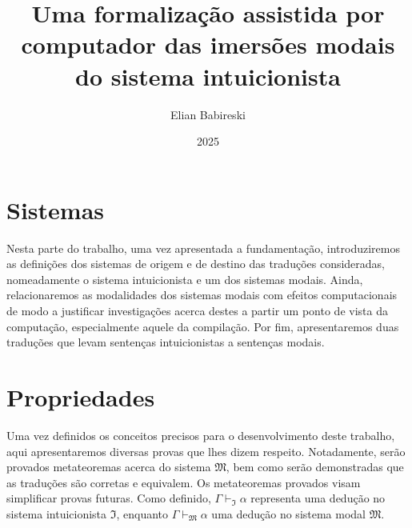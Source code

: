 


    \title{Uma formalização assistida por computador das imersões modais do sistema intuicionista}
    \author{Elian Babireski}
    \date{2025}

    
    
    
    
    
    
    
    

    \tableofcontents

    \setcounter{page}{9}

    
    

    \chapter{Sistemas}\label{systems}

        Nesta parte do trabalho, uma vez apresentada a fundamentação, introduziremos as definições dos sistemas de origem e de destino das traduções consideradas, nomeadamente o sistema intuicionista e um dos sistemas modais.
        Ainda, relacionaremos as modalidades dos sistemas modais com efeitos computacionais de modo a justificar investigações acerca destes a partir um ponto de vista da computação, especialmente aquele da compilação.
        Por fim, apresentaremos duas traduções que levam sentenças intuicionistas a sentenças modais.

        \label{systems.intuitionistic}
        \label{systems.modal}
        \label{systems.effects}
        \label{systems.translations}

    \chapter{Propriedades}\label{properties}
        Uma vez definidos os conceitos precisos para o desenvolvimento deste trabalho, aqui apresentaremos diversas provas que lhes dizem respeito.
        Notadamente, serão provados metateoremas acerca do sistema $\mathfrak{M}$, bem como serão demonstradas que as traduções são corretas e equivalem.
        Os metateoremas provados visam simplificar provas futuras.
        Como definido, $\Gamma\vdash_\mathfrak{I}\alpha$ representa uma dedução no sistema intuicionista $\mathfrak{I}$, enquanto $\Gamma\vdash_\mathfrak{M}\alpha$ uma dedução no sistema modal $\mathfrak{M}$.

